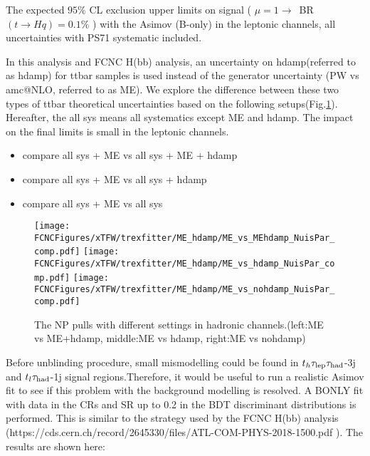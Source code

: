 \begin{table}
\caption{The expected $95\%$ CL exclusion upper limits on signal ( $\mu=1\to$~BR$(t\to Hq)=0.1\%$ ) with the Asimov (B-only) in the leptonic channels, all uncertainties with PS71 systematic included.}
\label{tab:tthML_ttbarPS_vs_ttbarPS71}

\end{table}



In this analysis and FCNC H(bb) analysis, an uncertainty on hdamp(referred to as hdamp) for ttbar samples is used instead of the generator uncertainty (PW vs amc@NLO, referred to as ME). We explore the difference between these two types of ttbar theoretical uncertainties based on the following setups(Fig.\ref{fig:xTFW_ME_vs_MEhdamp}). Hereafter, the all sys means all systematics except ME and hdamp. The impact on the final limits is small in the leptonic channels. 

\begin{itemize}
	\item compare all sys + ME  vs  all sys + ME + hdamp
	\item compare all sys + ME  vs  all sys + hdamp 
	\item compare all sys + ME  vs  all sys
\end{itemize}

\begin{figure}[H]
\centering
\texttt{[image: \\FCNCFigures/xTFW/trexfitter/ME\_hdamp/ME\_vs\_MEhdamp\_NuisPar\_comp.pdf]}
\texttt{[image: \\FCNCFigures/xTFW/trexfitter/ME\_hdamp/ME\_vs\_hdamp\_NuisPar\_comp.pdf]}
\texttt{[image: \\FCNCFigures/xTFW/trexfitter/ME\_hdamp/ME\_vs\_nohdamp\_NuisPar\_comp.pdf]}
\caption{The NP pulls with different settings in hadronic channels.(left:ME vs ME+hdamp, middle:ME vs hdamp, right:ME vs nohdamp)}
\label{fig:xTFW_ME_vs_MEhdamp}
\end{figure}

		

Before unblinding procedure, small mismodelling could be found  in $t_h\tau_\text{lep}{}\tau_\text{had}$-3j and $t_l\tau_\text{had}$-1j signal regions.Therefore, it would be useful to run a realistic Asimov fit to see if this problem with the background modelling is resolved. A BONLY fit with data in the CRs and SR up to 0.2 in the BDT discriminant distributions is performed. This is similar to the strategy used by the FCNC H(bb) analysis (https://cds.cern.ch/record/2645330/files/ATL-COM-PHYS-2018-1500.pdf ). The results are shown here:


